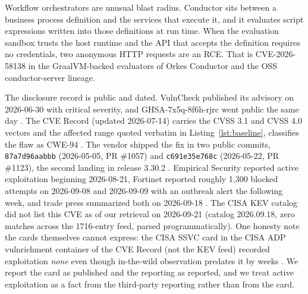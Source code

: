 \documentclass[journal]{IEEEtran}
\begin{document}
Workflow orchestrators are unusual blast radius. Conductor sits between a
business process definition and the services that execute it, and it evaluates
script expressions written into those definitions at run time. When the
evaluation sandbox trusts the host runtime and the API that accepts the
definition requires no credentials, two anonymous HTTP requests are an RCE.
That is CVE-2026-58138 in the GraalVM-backed evaluators of Orkes Conductor and
the OSS conductor-server lineage.

The disclosure record is public and dated. VulnCheck published its advisory on
2026-06-30
with critical severity, and GHSA-7x5q-8f6h-rjrc went public the same day
\cite{vulncheck,ghsa}. The CVE Record (updated 2026-07-14) carries the CVSS
3.1 and CVSS 4.0 vectors and the affected range quoted verbatim in
Listing~\ref{lst:baseline},
classifies the flaw as CWE-94
\cite{cverecord}. The vendor shipped the fix in two public commits,
\texttt{87a7d96aabbb} (2026-05-05, PR \#1057) and \texttt{c691e35e768c}
(2026-05-22, PR \#1123), the second landing in release 3.30.2
\cite{fixcommits}. Empirical Security reported active exploitation beginning
2026-08-21, Fortinet reported roughly 1,300 blocked attempts on 2026-09-08 and
2026-09-09 with an outbreak alert the following week, and trade press
summarized both on 2026-09-18 \cite{itw}. The CISA KEV catalog did not list
this CVE as of our retrieval on 2026-09-21 (catalog 2026.09.18, zero matches
across the 1716-entry feed, parsed programmatically). One honesty note the
cards themselves cannot express: the CISA SSVC card in the CISA ADP
vulnrichment container of the CVE Record (not the KEV feed) recorded
exploitation \emph{none} even though in-the-wild observation predates it by
weeks \cite{cverecord}. We report the card as published and the reporting as
reported, and we treat active exploitation as a fact from the third-party
reporting rather than from the card.
\end{document}
